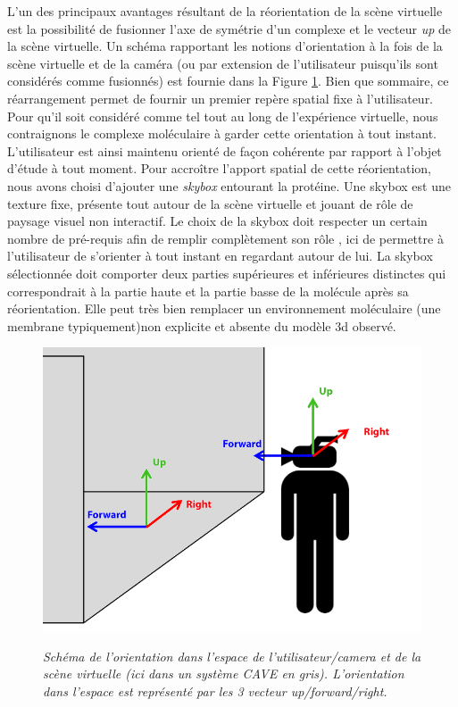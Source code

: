 L'un des principaux avantages résultant de la réorientation de la scène virtuelle est la possibilité de fusionner l'axe de symétrie d'un complexe et le vecteur \textit{up} de la scène virtuelle. Un schéma rapportant les notions d'orientation à la fois de la scène virtuelle et de la caméra (ou par extension de l'utilisateur puisqu'ils sont considérés comme fusionnés) est fournie dans la Figure \ref{Fig:orientation_camera_EV}. 
Bien que sommaire, ce réarrangement permet de fournir un premier repère spatial fixe à l'utilisateur. Pour qu'il soit considéré comme tel tout au long de l'expérience virtuelle, nous contraignons le complexe moléculaire à garder cette orientation à tout instant. L'utilisateur est ainsi maintenu orienté de façon cohérente par rapport à l'objet d'étude à tout moment. Pour accroître l'apport spatial de cette réorientation, nous avons choisi d'ajouter une \textit{skybox} entourant la protéine. Une skybox est une texture fixe, présente tout autour de la scène virtuelle et jouant de rôle de paysage visuel non interactif. Le choix de la skybox doit respecter un certain nombre de pré-requis afin de remplir complètement son rôle \cite{vinson_design_1999}, ici de permettre à l'utilisateur de s'orienter à tout instant en regardant autour de lui. La skybox sélectionnée doit comporter deux parties supérieures et inférieures distinctes qui correspondrait à la partie haute et la partie basse de la molécule après sa réorientation. Elle peut très bien remplacer un environnement moléculaire (une membrane typiquement)non explicite et absente du modèle 3d observé.

\begin{figure}[h]
  \centering
  {\includegraphics[width=.5\linewidth]{./figures/ch3/orientation_camera_EV}}
    \caption{{\it Schéma de l'orientation dans l'espace de l'utilisateur/camera et de la scène virtuelle (ici dans un système CAVE en gris). L'orientation dans l'espace est représenté par les 3 vecteur up/forward/right.}}
  \label{Fig:orientation_camera_EV}
  \hspace{0.2cm}
\end{figure}

